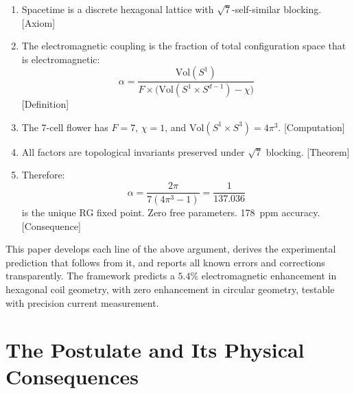 \documentclass[12pt,a4paper]{article}
\theoremstyle{plain}
\theoremstyle{definition}
\newcommand{\elabel}[1]{\textsf{\small [#1]}}
\begin{document}
\begin{tcolorbox}[colback=black!3!white, colframe=black!60!white, title=\textbf{Core Result}]
\begin{enumerate}[label=\textbf{(\arabic*)}, leftmargin=2em]
    \item Spacetime is a discrete hexagonal lattice with $\sqrt{7}$-self-similar blocking. \hfill\elabel{Axiom}
    \item The electromagnetic coupling is the fraction of total configuration space that is electromagnetic:
    \begin{equation*}
    \alpha = \frac{\mathrm{Vol}(S^1)}{F \times \bigl(\mathrm{Vol}(S^1 \times S^{d-1}) - \chi\bigr)}
    \end{equation*} \hfill\elabel{Definition}
    \item The 7-cell flower has $F = 7$, $\chi = 1$, and $\mathrm{Vol}(S^1 \times S^3) = 4\pi^3$. \hfill\elabel{Computation}
    \item All factors are topological invariants preserved under $\sqrt{7}$ blocking. \hfill\elabel{Theorem}
    \item Therefore:
    \begin{equation*}
    \boxed{\alpha = \frac{2\pi}{7(4\pi^3 - 1)} = \frac{1}{137.036}}
    \end{equation*}
    is the unique RG fixed point. Zero free parameters. 178~ppm accuracy. \hfill\elabel{Consequence}
\end{enumerate}
\end{tcolorbox}

\vspace{0.5em}

This paper develops each line of the above argument, derives the experimental prediction that follows from it, and reports all known errors and corrections transparently. The framework predicts a $5.4\%$ electromagnetic enhancement in hexagonal coil geometry, with zero enhancement in circular geometry, testable with precision current measurement.

\tableofcontents
\newpage

\section{The Postulate and Its Physical Consequences}\label{sec:postulate}
\end{document}
